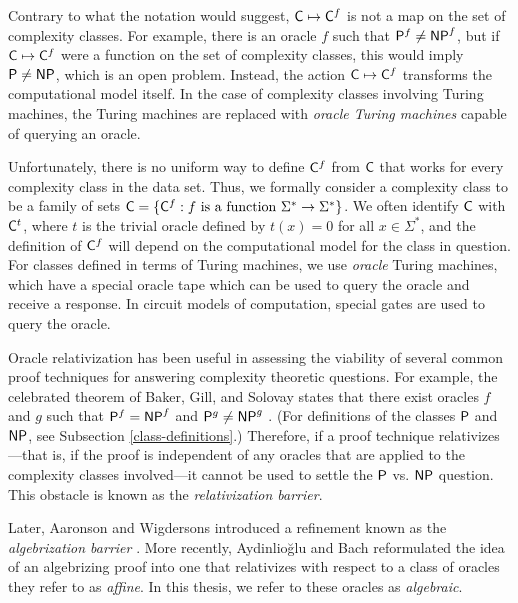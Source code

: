 Contrary to what the notation would suggest, $\mathsf{C}\mapsto\mathsf{C}^f$ is not a map on 
the set of complexity classes. For example, there is an oracle $f$ such that 
$\mathsf{P}^f\neq\mathsf{NP}^f$, but if $\mathsf{C}\mapsto\mathsf{C}^f$ were a function on the set of 
complexity classes, this would imply $\mathsf{P}\neq\mathsf{NP}$, which is an open problem. 
Instead, the action $\mathsf{C}\mapsto\mathsf{C}^f$ transforms the computational model 
itself. In the case of complexity classes involving Turing machines, the Turing
machines are replaced with \textit{oracle Turing machines} capable of querying 
an oracle.

Unfortunately, there is no uniform way to define $\mathsf{C}^f$ from $\mathsf{C}$ that works
for every complexity class in the data set. Thus, we formally consider a
complexity class to be a family of sets $\mathsf{C}=\{\mathsf{C}^f:f\text{ is a function 
}\Sigma^*\rightarrow\Sigma^*\}$. We often identify $\mathsf{C}$ with $\mathsf{C}^t$, where $t$ is the 
trivial oracle defined by $t(x)=0$ for all $x\in\Sigma^*$, and the definition of
$\mathsf{C}^f$ will depend on the computational model for the class in question. For 
classes defined in terms of Turing machines, we use \textit{oracle} Turing 
machines, which have a special oracle tape which can be used to query the oracle 
and receive a response. In circuit models of computation, special gates are used 
to query the oracle.

Oracle relativization has been useful in assessing the viability of several common 
proof techniques for answering complexity theoretic questions. For example, the 
celebrated theorem of Baker, Gill, and Solovay states that there exist oracles $f$ 
and $g$ such that $\mathsf{P}^f=\mathsf{NP}^f$ and $\mathsf{P}^g\neq\mathsf{NP}^g$ 
\cite{baker1975relativizations}. (For definitions of the classes $\mathsf{P}$ and $\mathsf{NP}$, 
see Subsection \ref{class-definitions}.) Therefore, if a proof technique 
relativizes---that is, if the proof is independent of any oracles that are applied 
to the complexity classes involved---it cannot be used to settle the $\mathsf{P}$ vs. 
$\mathsf{NP}$ question. This obstacle is known as the \textit{relativization barrier}.

Later, Aaronson and Wigdersons introduced a refinement known as the 
\textit{algebrization barrier} \cite{aaronson2009algebrization}. More recently, 
Aydinlio\u{g}lu and Bach reformulated the idea of an algebrizing proof into one 
that relativizes with respect to a class of oracles they refer to as 
\textit{affine}. In this thesis, we refer to these oracles as \textit{algebraic}.